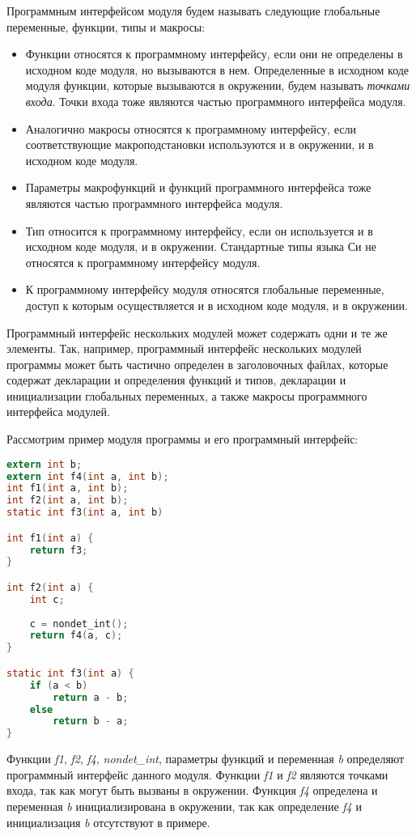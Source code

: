 Программным интерфейсом модуля будем называть следующие глобальные переменные, функции, типы и макросы:
\begin{itemize}
    \item Функции относятся к программному интерфейсу, если они не определены в исходном коде модуля, но вызываются в нем. Определенные в исходном коде модуля функции, которые вызываются в окружении, будем называть \textit{точками входа}.
    Точки входа тоже являются частью программного интерфейса модуля.
    \item Аналогично макросы относятся к программному интерфейсу, если соответствующие макроподстановки используются и в окружении, и в исходном коде модуля.
    \item Параметры макрофункций и функций программного интерфейса тоже являются частью программного интерфейса модуля.
    \item Тип относится к программному интерфейсу, если он используется и в исходном коде модуля, и в окружении.
    Стандартные типы языка Си не относятся к программному интерфейсу модуля.
    \item К программному интерфейсу модуля относятся глобальные переменные, доступ к которым осуществляется и в исходном коде модуля, и в окружении.
\end{itemize}

Программный интерфейс нескольких модулей может содержать одни и те же элементы.
Так, например, программный интерфейс нескольких модулей программы может быть частично определен в заголовочных файлах, которые содержат декларации и определения функций и типов, декларации и инициализации глобальных переменных, а также макросы программного интерфейса модулей.

Рассмотрим пример модуля программы и его программный интерфейс:
\begin{lstlisting}[language=C,basicstyle=\small]
extern int b;
extern int f4(int a, int b);
int f1(int a, int b);
int f2(int a, int b);
static int f3(int a, int b)

int f1(int a) {
    return f3;
}

int f2(int a) {
    int c;
    
    c = nondet_int();
    return f4(a, c);
}

static int f3(int a) {
    if (a < b)
        return a - b;
    else
        return b - a;
}
\end{lstlisting}

Функции \textit{f1}, \textit{f2}, \textit{f4}, \textit{nondet\_int}, параметры функций и переменная \textit{b} определяют программный интерфейс данного модуля. 
Функции \textit{f1} и \textit{f2} являются точками входа, так как могут быть вызваны в окружении.
Функция \textit{f4} определена и переменная \textit{b} инициализирована в окружении, так как определение \textit{f4} и инициализация \textit{b} отсутствуют в примере.

